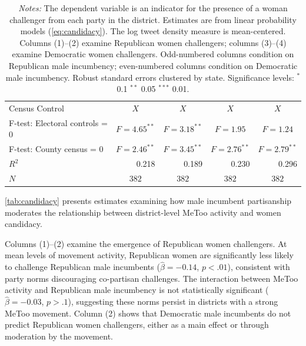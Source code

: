 \documentclass[manuscript,screen,nonacm,11pt,acm]{acmart}
\begin{document}
\begin{table}[tbp]
\begin{adjustbox}{max width=1\textwidth}
\begin{tabular}{@{\hspace{0\tabcolsep}}l*{4}{D{.}{.}{-1}}@{\hspace{0\tabcolsep}}}
Census Control      &         &         &         &         \\
F-test: Electoral controls = 0&         &         &         &         \\
F-test: County census = 0&         &         &         &         \\
$ R^2 $             &   0.218         &   0.189         &   0.230         &   0.296         \\
$ N $               &         &         &         &         \\
			\bottomrule
		\end{tabular}
	\end{adjustbox}
	\caption*{
		\footnotesize
		\emph{Notes:}
		The dependent variable is an indicator for the presence of a woman challenger from each party in the district.
		Estimates are from linear probability models (\cref{eq:candidacy}).
		The log tweet density measure is mean-centered.
		Columns (1)--(2) examine Republican women challengers; columns (3)--(4) examine Democratic women challengers.
		Odd-numbered columns condition on Republican male incumbency; even-numbered columns condition on Democratic male incumbency.
		Robust standard errors clustered by state.
		Significance levels: $^*$ 0.1 $^{**}$ 0.05 $^{***}$ 0.01.
	}
\end{table}

\cref{tab:candidacy} presents estimates examining how male incumbent partisanship moderates the relationship between district-level MeToo activity and women candidacy.

Columns (1)--(2) examine the emergence of Republican women challengers.
At mean levels of movement activity, Republican women are significantly less likely to challenge Republican male incumbents ($\hat{\beta} = -0.14$, $p < .01$), consistent with party norms discouraging co-partisan challenges.
The interaction between MeToo activity and Republican male incumbency is not statistically significant ($\hat{\beta} = -0.03$, $p > .1$), suggesting these norms persist in districts with a strong MeToo movement.
Column (2) shows that Democratic male incumbents do not predict Republican women challengers, either as a main effect or through moderation by the movement.
\end{document}
